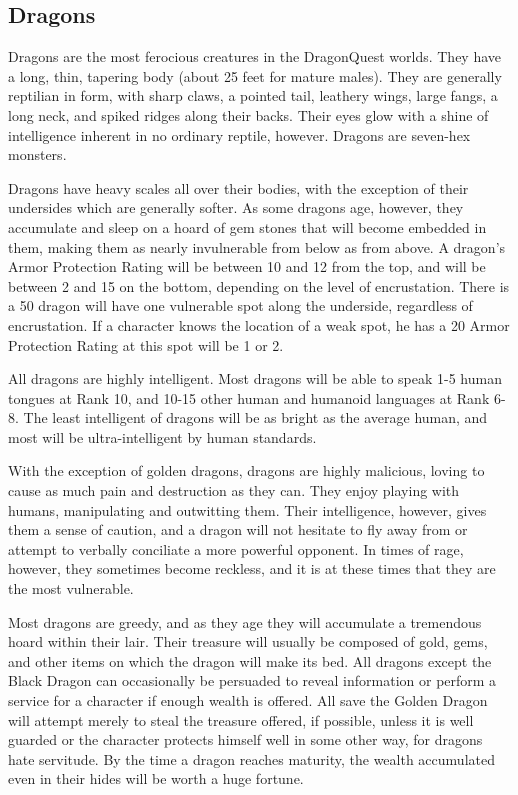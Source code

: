 \begin{multicols}{2}

\setlength\columnseprule{0.2mm}

\section{Dragons}
Dragons are the most ferocious creatures in the DragonQuest worlds.
They have a long, thin, tapering body (about 25 feet for mature
males).  They are generally reptilian in form, with sharp claws, a
pointed tail, leathery wings, large fangs, a long neck, and spiked
ridges along their backs. Their eyes glow with a shine of intelligence
inherent in no ordinary reptile, however.  Dragons are seven-hex
monsters.

Dragons have heavy scales all over their bodies, with the exception of
their undersides which are generally softer.  As some dragons age,
however, they accumulate and sleep on a hoard of gem stones that will
become embedded in them, making them as nearly invulnerable from below
as from above.  A dragon's Armor Protection Rating will be between 10
and 12 from the top, and will be between 2 and 15 on the bottom,
depending on the level of encrustation. There is a 50%
dragon will have one vulnerable spot along the underside, regardless
of encrustation.  If a character knows the location of a weak spot, he
has a 20%
Armor Protection Rating at this spot will be 1 or 2.

All dragons are highly intelligent. Most dragons will be able to speak
1-5 human tongues at Rank 10, and 10-15 other human and humanoid
languages at Rank 6-8.  The least intelligent of dragons will be as
bright as the average human, and most will be ultra-intelligent by
human standards.

With the exception of golden dragons, dragons are highly malicious,
loving to cause as much pain and destruction as they can.  They enjoy
playing with humans, manipulating and outwitting them. Their
intelligence, however, gives them a sense of caution, and a dragon
will not hesitate to fly away from or attempt to verbally conciliate a
more powerful opponent.  In times of rage, however, they sometimes
become reckless, and it is at these times that they are the most
vulnerable.

Most dragons are greedy, and as they age they will accumulate a
tremendous hoard within their lair. Their treasure will usually be
composed of gold, gems, and other items on which the dragon will make
its bed. All dragons except the Black Dragon can occasionally be
persuaded to reveal information or perform a service for a character
if enough wealth is offered.  All save the Golden Dragon will attempt
merely to steal the treasure offered, if possible, unless it is well
guarded or the character protects himself well in some other way, for
dragons hate servitude.  By the time a dragon reaches maturity, the
wealth accumulated even in their hides will be worth a huge fortune.


\end{multicols}
